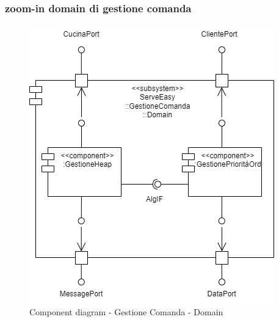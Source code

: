 \subsubsection{zoom-in domain di gestione comanda}
\begin{figure}[H]
	\centering
	\includegraphics[scale=0.5]{iterazione1/images/component_comanda_cucina-GestioneComanda__Domain.jpg}
	\caption{Component diagram - Gestione Comanda - Domain \label{fig:component_diagram_gestione_comanda_domain}}
\end{figure}

